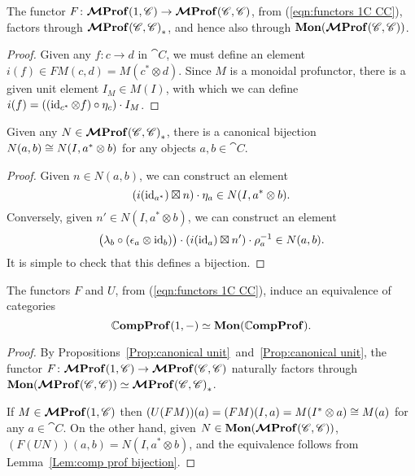 \documentclass[12pt,oneside,article,draft]{memoir}
\begin{document}
\begin{proposition}\label{Prop:canonical unit}
   The functor $F\colon\bm{\mathcal{M}}\mathbf{Prof}(1,\mathscr{C})\to\bm{\mathcal{M}}\mathbf{Prof}(\mathscr{C},\mathscr{C})$, from (\ref{eqn:functors 1C CC}), factors through $\bm{\mathcal{M}}\mathbf{Prof}{(\mathscr{C},\mathscr{C})}_*$, and hence also through $\mathbf{Mon}(\bm{\mathcal{M}}\mathbf{Prof}(\mathscr{C},\mathscr{C}))$.
\end{proposition}
\begin{proof}
   Given any $f\colon c\to d$ in $\cat{C}$, we must define an element $i(f)\in FM(c,d)=M(c^*\otimes d)$.
   Since $M$ is a monoidal profunctor, there is a given unit element $I_M\in M(I)$, with which we can define $i(f)=((\operatorname{id}_{c^*}\otimes f)\circ\eta_c)\cdot I_M$.
\end{proof}

\begin{lemma}\label{Lem:comp prof bijection}
   Given any $N\in\bm{\mathcal{M}}\mathbf{Prof}{(\mathscr{C},\mathscr{C})}_*$, there is a canonical bijection $N(a,b)\cong N(I,a^*\otimes b)$ for any objects $a,b\in\cat{C}$.
\end{lemma}
\begin{proof}
   Given $n\in N(a,b)$, we can construct an element
   \[
      (i(\operatorname{id}_{a^*})\boxtimes n)\cdot\eta_a \in N(I,a^*\otimes b).
   \]
   Conversely, given $n'\in N(I,a^*\otimes b)$, we can construct an element
   \[
      \bigl(\lambda_b\circ(\epsilon_a\otimes\operatorname{id}_b)\bigr)\cdot(i(\operatorname{id}_a)\boxtimes n')\cdot\rho_a^{-1} \in N(a,b).
   \]
   It is simple to check that this defines a bijection.
\end{proof}

\begin{proposition}\label{Prop:mon prof equivalence}
   The functors $F$ and $U$, from (\ref{eqn:functors 1C CC}), induce an equivalence of categories
   \[
      \mathbb{C}\mathbf{ompProf}(1,-)\simeq\mathbf{Mon}(\mathbb{C}\mathbf{ompProf}).
   \]
\end{proposition}
\begin{proof}
   By Propositions~\ref{Prop:canonical unit}~and~\ref{Prop:canonical unit}, the functor $F\colon\bm{\mathcal{M}}\mathbf{Prof}(1,\mathscr{C}) \to \bm{\mathcal{M}}\mathbf{Prof}(\mathscr{C},\mathscr{C})$ naturally factors through $\mathbf{Mon}(\bm{\mathcal{M}}\mathbf{Prof}(\mathscr{C},\mathscr{C}))\simeq\bm{\mathcal{M}}\mathbf{Prof}{(\mathscr{C},\mathscr{C})}_*$.

   If $M\in\bm{\mathcal{M}}\mathbf{Prof}(1,\mathscr{C})$ then $(U(FM))(a)=(FM)(I,a)=M(I^*\otimes a)\cong M(a)$ for any $a\in\cat{C}$.
   On the other hand, given $N\in\mathbf{Mon}(\bm{\mathcal{M}}\mathbf{Prof}(\mathscr{C},\mathscr{C}))$, $(F(UN))(a,b)=N(I,a^*\otimes b)$, and the equivalence follows from Lemma~\ref{Lem:comp prof bijection}.
\end{proof}
\end{document}
